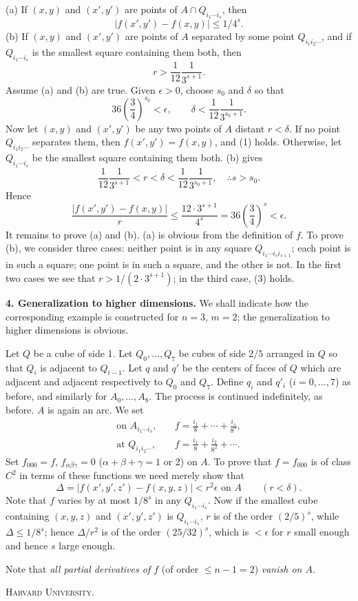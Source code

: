\documentclass[11pt,a4paper,leqno,twoside]{article}
\newcommand{\sect}[1]{\par\medskip\noindent\textbf{#1}\enspace}
\begin{document}
(a) If $(x,y)$ and $(x',y')$ are points of $A\cap Q_{i_1\cdots i_s}$, then
\begin{equation}\tag{2}|f(x',y')-f(x,y)|\leq1/4^s.\end{equation}
(b) If $(x,y)$ and $(x',y')$ are points of $A$ separated by some point $Q_{i_1i_2\cdots}$, and if $Q_{i_1\cdots i_s}$ is the smallest square containing them both, then
\begin{equation}\tag{3}r>\frac1{12}\frac1{3^{s+1}}.\end{equation}
Assume (a) and (b) are true. Given $\epsilon>0$, choose $s_0$ and $\delta$ so that
\begin{equation}\tag{4}36\left(\frac34\right)^{s_0}<\epsilon,\qquad\delta<\frac1{12}\frac1{3^{s_0+1}}.\end{equation}
Now let $(x,y)$ and $(x',y')$ be any two points of $A$ distant $r<\delta$. If no point $Q_{i_1i_2\cdots}$ separates them, then $f(x',y')=f(x,y)$, and (1) holds. Otherwise, let $Q_{i_1\cdots i_s}$ be the smallest square containing them both. (b) gives
\[\frac1{12}\frac1{3^{s+1}}<r<\delta<\frac1{12}\frac1{3^{s_0+1}},\quad\therefore s>s_0.\]
Hence
\[\frac{|f(x',y')-f(x,y)|}{r}\leq\frac{12\cdot3^{s+1}}{4^s}=36\left(\frac34\right)^s<\epsilon.\]
\newpage %
It remains to prove (a) and (b). (a) is obvious from the definition of $f$. To prove (b), we consider three cases: neither point is in any square $Q_{i_1\cdots i_s i_{s+1}}$; each point is in such a square; one point is in such a square, and the other is not. In the first two cases we see that $r>1/(2\cdot3^{s+1})$; in the third case, (3) holds.

\sect{4. Generalization to higher dimensions.} We shall indicate how the corresponding example is constructed for $n=3$, $m=2$; the generalization to higher dimensions is obvious.

Let $Q$ be a cube of side 1. Let $Q_0,\ldots,Q_7$ be cubes of side $2/5$ arranged in $Q$ so that $Q_i$ is adjacent to $Q_{i-1}$. Let $q$ and $q'$ be the centers of faces of $Q$ which are adjacent and adjacent respectively to $Q_0$ and $Q_7$. Define $q_i$ and $q'_i$ ($i=0,\ldots,7$) as before, and similarly for $A_0,\ldots,A_8$. The process is continued indefinitely, as before. $A$ is again an arc. We set
\[
\begin{aligned}
\text{on }A_{i_1\cdots i_s},\quad &f=\frac{i_1}{8}+\cdots+\frac{i_s}{8^s},\\[8pt]
\text{at }Q_{i_1i_2\cdots},\quad &f=\frac{i_1}{8}+\frac{i_2}{8^2}+\cdots.
\end{aligned}
\]
Set $f_{000}=f$, $f_{\alpha\beta\gamma}=0$ ($\alpha+\beta+\gamma=1$ or 2) on $A$. To prove that $f=f_{000}$ is of class $C^2$ in terms of these functions we need merely show that
\begin{equation}\tag{5}\Delta=|f(x',y',z')-f(x,y,z)|<r^2\epsilon\text{ on }A\qquad(r<\delta).\end{equation}
Note that $f$ varies by at most $1/8^s$ in any $Q_{i_1\cdots i_s}$. Now if the smallest cube containing $(x,y,z)$ and $(x',y',z')$ is $Q_{i_1\cdots i_s}$, $r$ is of the order $(2/5)^s$, while $\Delta\leq1/8^s$; hence $\Delta/r^2$ is of the order $(25/32)^s$, which is $<\epsilon$ for $r$ small enough and hence $s$ large enough.

Note that \textit{all partial derivatives of $f$} (of order $\leq n-1=2$) \textit{vanish on $A$}.

\medskip\textsc{Harvard University.}
\end{document}
